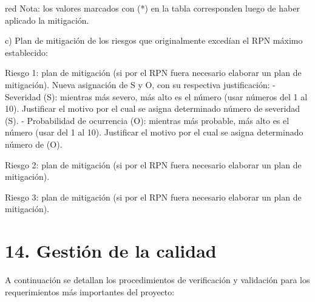 \documentclass[
11pt, %
]{charter}
\begin{document}
\begin{consigna}{red}
Nota: los valores marcados con (*) en la tabla corresponden luego de haber aplicado la mitigación.

c) Plan de mitigación de los riesgos que originalmente excedían el RPN máximo establecido:
 
Riesgo 1: plan de mitigación (si por el RPN fuera necesario elaborar un plan de mitigación).
  Nueva asignación de S y O, con su respectiva justificación:
  - Severidad (S): mientras más severo, más alto es el número (usar números del 1 al 10).
          Justificar el motivo por el cual se asigna determinado número de severidad (S).
  - Probabilidad de ocurrencia (O): mientras más probable, más alto es el número (usar del 1 al 10).
          Justificar el motivo por el cual se asigna determinado número de (O).

Riesgo 2: plan de mitigación (si por el RPN fuera necesario elaborar un plan de mitigación).
 
Riesgo 3: plan de mitigación (si por el RPN fuera necesario elaborar un plan de mitigación).

\end{consigna}


\section{14. Gestión de la calidad}
\label{sec:calidad}

A continuación se detallan los procedimientos de verificación y validación para los requerimientos más importantes del proyecto:
\end{document}
